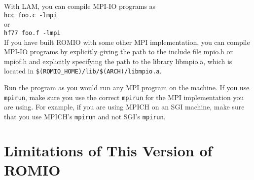 With LAM, you can compile MPI-IO programs as \\
\hspace*{.4in} {\tt hcc foo.c -lmpi}\\
or \\
\hspace*{.4in} {\tt hf77 foo.f -lmpi}\\

If you have built ROMIO with some other MPI implementation, you can
compile MPI-IO programs by explicitly giving the path to the include
file mpio.h or mpiof.h and explicitly specifying the path to the
library libmpio.a, which is located in {\tt \$(ROMIO\_HOME)/lib/\$(ARCH)/libmpio.a}.

Run the program as you would run any MPI program on the machine.
If you use {\tt mpirun}, make sure you use the correct {\tt mpirun}
for the MPI implementation you are using. For example, if you
are using MPICH on an SGI machine, make sure that you use MPICH's
{\tt mpirun} and not SGI's {\tt mpirun}.


%
%
\section{Limitations of This Version of ROMIO \label{sec:limit}}

